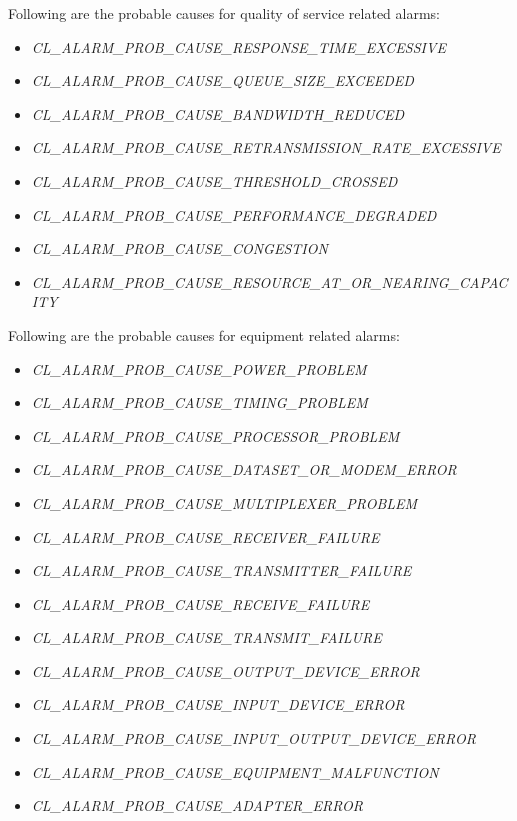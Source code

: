 \begin{flushleft}
\par
Following are the probable causes for quality of service related alarms:
\begin{itemize}
\item \textit{CL\_\-ALARM\_\-PROB\_\-CAUSE\_\-RESPONSE\_\-TIME\_\-EXCESSIVE}
\item \textit{CL\_\-ALARM\_\-PROB\_\-CAUSE\_\-QUEUE\_\-SIZE\_\-EXCEEDED}
\item \textit{CL\_\-ALARM\_\-PROB\_\-CAUSE\_\-BANDWIDTH\_\-REDUCED}
\item \textit{CL\_\-ALARM\_\-PROB\_\-CAUSE\_\-RETRANSMISSION\_\-RATE\_\-EXCESSIVE}
\item \textit{CL\_\-ALARM\_\-PROB\_\-CAUSE\_\-THRESHOLD\_\-CROSSED}
\item \textit{CL\_\-ALARM\_\-PROB\_\-CAUSE\_\-PERFORMANCE\_\-DEGRADED}
\item \textit{CL\_\-ALARM\_\-PROB\_\-CAUSE\_\-CONGESTION}
\item \textit{CL\_\-ALARM\_\-PROB\_\-CAUSE\_\-RESOURCE\_\-AT\_\-OR\_\-NEARING\_\-CAPACITY}
\end{itemize}

\par
Following are the probable causes for equipment related alarms:
\begin{itemize}
\item \textit{CL\_\-ALARM\_\-PROB\_\-CAUSE\_\-POWER\_\-PROBLEM}
\item \textit{CL\_\-ALARM\_\-PROB\_\-CAUSE\_\-TIMING\_\-PROBLEM}
\item \textit{CL\_\-ALARM\_\-PROB\_\-CAUSE\_\-PROCESSOR\_\-PROBLEM}
\item \textit{CL\_\-ALARM\_\-PROB\_\-CAUSE\_\-DATASET\_\-OR\_\-MODEM\_\-ERROR}
\item \textit{CL\_\-ALARM\_\-PROB\_\-CAUSE\_\-MULTIPLEXER\_\-PROBLEM}
\item \textit{CL\_\-ALARM\_\-PROB\_\-CAUSE\_\-RECEIVER\_\-FAILURE}
\item \textit{CL\_\-ALARM\_\-PROB\_\-CAUSE\_\-TRANSMITTER\_\-FAILURE}
\item \textit{CL\_\-ALARM\_\-PROB\_\-CAUSE\_\-RECEIVE\_\-FAILURE}
\item \textit{CL\_\-ALARM\_\-PROB\_\-CAUSE\_\-TRANSMIT\_\-FAILURE}
\item \textit{CL\_\-ALARM\_\-PROB\_\-CAUSE\_\-OUTPUT\_\-DEVICE\_\-ERROR}
\item \textit{CL\_\-ALARM\_\-PROB\_\-CAUSE\_\-INPUT\_\-DEVICE\_\-ERROR}
\item \textit{CL\_\-ALARM\_\-PROB\_\-CAUSE\_\-INPUT\_\-OUTPUT\_\-DEVICE\_\-ERROR}
\item \textit{CL\_\-ALARM\_\-PROB\_\-CAUSE\_\-EQUIPMENT\_\-MALFUNCTION}
\item \textit{CL\_\-ALARM\_\-PROB\_\-CAUSE\_\-ADAPTER\_\-ERROR}
\end{itemize}


\end{flushleft}
